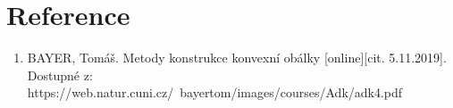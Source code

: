 \documentclass[a4paper, 12pt]{article}
\begin{document}
\section{Reference}

\begin{enumerate}

\item  BAYER, Tomáš. Metody konstrukce konvexní obálky [online][cit. 5.11.2019]. \\
Dostupné z: https://web.natur.cuni.cz/~bayertom/images/courses/Adk/adk4.pdf  \\

\end{enumerate}
\end{document}
